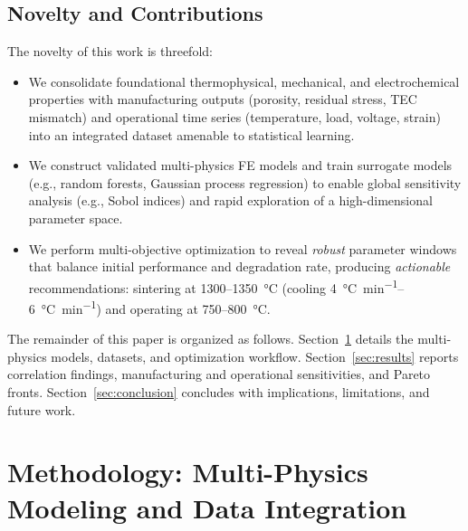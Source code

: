 \documentclass[conference]{IEEEtran}
\begin{document}
\subsection{Novelty and Contributions}
The novelty of this work is threefold:
\begin{itemize}[leftmargin=*]
  \item We consolidate foundational thermophysical, mechanical, and electrochemical properties with manufacturing outputs (porosity, residual stress, TEC mismatch) and operational time series (temperature, load, voltage, strain) into an integrated dataset amenable to statistical learning.
  \item We construct validated multi-physics FE models and train surrogate models (e.g., random forests, Gaussian process regression) to enable global sensitivity analysis (e.g., Sobol indices) and rapid exploration of a high-dimensional parameter space.
  \item We perform multi-objective optimization to reveal \emph{robust} parameter windows that balance initial performance and degradation rate, producing \emph{actionable} recommendations: sintering at \SI{1300}{}–\SI{1350}{\celsius} (cooling \SIrange{4}{6}{\celsius\per\minute}) and operating at \SI{750}{}–\SI{800}{\celsius}.
\end{itemize}
\noindent The remainder of this paper is organized as follows. Section~\ref{sec:methods} details the multi-physics models, datasets, and optimization workflow. Section~\ref{sec:results} reports correlation findings, manufacturing and operational sensitivities, and Pareto fronts. Section~\ref{sec:conclusion} concludes with implications, limitations, and future work.

\section{Methodology: Multi-Physics Modeling and Data Integration} \label{sec:methods}
\end{document}
